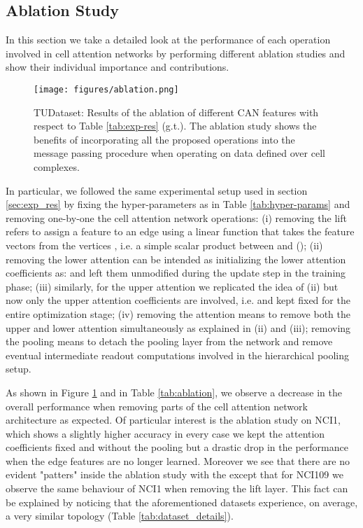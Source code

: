 \documentclass{article}
\begin{document}
\subsection{Ablation Study}\label{sec:ablation}

In this section we take a detailed look at the performance of each operation involved in cell attention networks by performing different ablation studies and show their individual importance and contributions. 



\begin{figure}[!htb]
    \centering
    \texttt{[image: figures/ablation.png]}
    \caption{TUDataset: Results of the ablation of different CAN features with respect to Table \ref{tab:exp-res} (g.t.). The ablation study shows the benefits of incorporating all the proposed operations into the message passing procedure when operating on data defined over cell complexes.}
    \label{fig:ablation}
\end{figure}


In particular, we followed the same experimental setup used in section \ref{sec:exp_res} by fixing the hyper-parameters as in Table \ref{tab:hyper-params} and removing one-by-one the cell attention network operations: (i) removing the lift refers to assign a feature  to an edge  using a linear function that takes the feature vectors   from the vertices , i.e. a simple scalar product between  and  (); (ii) removing the lower attention can be intended as initializing the lower attention coefficients as:  and left them unmodified during the update step in the training phase; (iii) similarly, for the upper attention we replicated the idea of (ii) but now only the upper attention coefficients are involved, i.e.   and kept fixed for the entire optimization stage; (iv) removing the attention means to remove both the upper and lower attention simultaneously as explained in (ii) and (iii); removing the pooling means to detach the pooling layer from the network and remove eventual intermediate readout computations involved in the hierarchical pooling setup.

As shown in Figure \ref{fig:ablation} and in Table \ref{tab:ablation}, we observe a decrease in the overall performance when removing parts of the cell attention network architecture as expected. Of particular interest is the ablation study on NCI1, which shows a slightly higher accuracy in every case we kept the attention coefficients fixed and without the pooling but a drastic drop in the performance when the edge features are no longer learned. Moreover we see that there are no evident "patters" inside the ablation study with the except that for NCI109 we observe the same behaviour of NCI1 when removing the lift layer. This fact can be explained by noticing that the aforementioned datasets experience, on average, a very similar topology (Table \ref{tab:dataset_details}).
\end{document}
